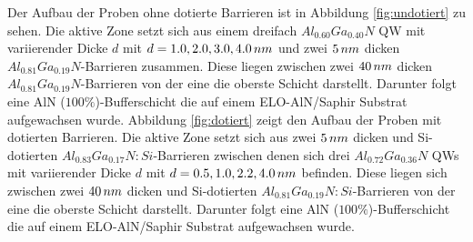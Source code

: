\noindent 
Der Aufbau der Proben ohne dotierte Barrieren ist in Abbildung \ref{fig:undotiert} zu sehen.
Die aktive Zone setzt sich aus einem dreifach $ Al_{0.60}Ga_{0.40}N$ QW mit variierender Dicke $d$ mit $d=1.0, 2.0, 3.0, 4.0 \thinspace nm$ und zwei $5 \thinspace nm$ dicken $ Al_{0.81}Ga_{0.19}N$-Barrieren zusammen. Diese liegen zwischen zwei $40 \thinspace nm$ dicken $ Al_{0.81}Ga_{0.19}N$-Barrieren von der eine die oberste Schicht darstellt. Darunter folgt eine AlN ($100\%$)-Bufferschicht die auf einem ELO-AlN/Saphir Substrat aufgewachsen wurde. 
\newline
Abbildung \ref{fig:dotiert} zeigt den Aufbau der Proben mit dotierten Barrieren. Die aktive Zone setzt sich aus zwei $5 \thinspace nm$ dicken und Si-dotierten $ Al_{0.83}Ga_{0.17}N:Si$-Barrieren zwischen denen sich drei $ Al_{0.72}Ga_{0.36}N$ QWs mit variierender Dicke $d$ mit $d=0.5, 1.0, 2.2, 4.0 \thinspace nm$ befinden. Diese liegen sich zwischen zwei $40 \thinspace nm$ dicken und Si-dotierten $ Al_{0.81}Ga_{0.19}N:Si$-Barrieren von der eine die oberste Schicht darstellt. Darunter folgt eine AlN ($100\%$)-Bufferschicht die auf einem ELO-AlN/Saphir Substrat aufgewachsen wurde. 
